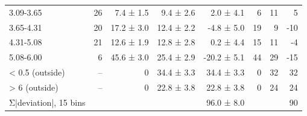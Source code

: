 \begin{table}[htbp]
\begin{tabular}{lrrrrrrr}
3.09-3.65 & 26 & 7.4 ± 1.5 & 9.4 ± 2.6 & 2.0 ± 4.1 & 6 & 11 & 5 \\
3.65-4.31 & 20 & 17.2 ± 3.0 & 12.4 ± 2.2 & -4.8 ± 5.0 & 19 & 9 & -10 \\
4.31-5.08 & 21 & 12.6 ± 1.9 & 12.8 ± 2.8 & 0.2 ± 4.4 & 15 & 11 & -4 \\
5.08-6.00 & 6 & 45.6 ± 3.0 & 25.4 ± 2.9 & -20.2 ± 5.1 & 44 & 29 & -15 \\
< 0.5 (outside) & -- & 0 & 34.4 ± 3.3 & 34.4 ± 3.3 & 0 & 32 & 32 \\
> 6 (outside) & -- & 0 & 22.8 ± 3.8 & 22.8 ± 3.8 & 0 & 24 & 24 \\
Σ|deviation|, 15 bins &  &  &  & 96.0 ± 8.0 &  &  & 90 \\
\bottomrule
\end{tabular}
\end{table}
